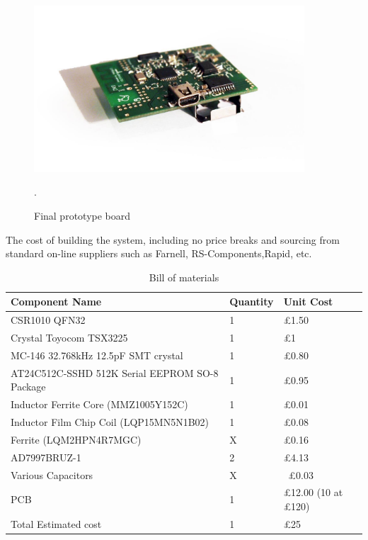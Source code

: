 \documentclass[]{article}
\begin{document}
\begin{figure}[H]
	\begin{center}
		\includegraphics[width = 0.9\textwidth]{board}
	\end{center}
	\caption{Final prototype board}. 
	\label{fig:board}
\end{figure}

The cost of building the system, including no price breaks and sourcing from standard on-line suppliers such as Farnell, RS-Components,Rapid, etc.

\begin{table}[H]
\centering
\caption{Bill of materials}
\label{tbl:bom}
\begin{tabular}{|p{2.1in}|p{2.1in}|p{2.1in}|} \hline 
\textbf{Component Name} & \textbf{Quantity} & \textbf{Unit Cost} \\ \hline 
CSR1010 QFN32 & 1 &  £1.50\\ \hline  
Crystal Toyocom TSX3225 & 1 & £1 \\ \hline 
MC-146 32.768kHz 12.5pF SMT crystal & 1 & £0.80 \\ \hline 
AT24C512C-SSHD 512K Serial EEPROM SO-8 Package & 1 & £0.95 \\ \hline 
Inductor Ferrite Core (MMZ1005Y152C)  & 1 & £0.01 \\ \hline 
Inductor Film Chip Coil (LQP15MN5N1B02) & 1 & £0.08 \\ \hline
Ferrite (LQM2HPN4R7MGC) & X & £0.16\\ \hline 
AD7997BRUZ-1 & 2 & £4.13 \\ \hline 
Various Capacitors & X & ~£0.03  \\ \hline 
PCB & 1 & £12.00 (10 at £120) \\ \hline 
Total Estimated cost & 1 & £25  \\ \hline 

\end{tabular}
\end{table}
\end{document}
